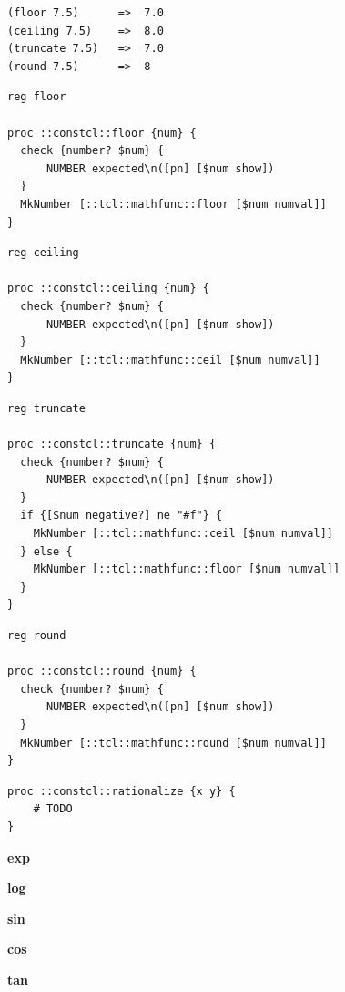 \documentclass[twoside,9pt]{report}
\begin{document}
\noindent\makebox[\linewidth]{\rule{\linewidth}{0.4pt}}
\begin{lstlisting}
(floor 7.5)      =>  7.0
(ceiling 7.5)    =>  8.0
(truncate 7.5)   =>  7.0
(round 7.5)      =>  8
\end{lstlisting}
\noindent\makebox[\linewidth]{\rule{\linewidth}{0.4pt}}
\noindent\makebox[\linewidth]{\rule{\linewidth}{0.4pt}}
\begin{lstlisting}
reg floor
 
proc ::constcl::floor {num} {
  check {number? $num} {
      NUMBER expected\n([pn] [$num show])
  }
  MkNumber [::tcl::mathfunc::floor [$num numval]]
}
\end{lstlisting}
\noindent\makebox[\linewidth]{\rule{\linewidth}{0.4pt}}
\noindent\makebox[\linewidth]{\rule{\linewidth}{0.4pt}}
\begin{lstlisting}
reg ceiling
 
proc ::constcl::ceiling {num} {
  check {number? $num} {
      NUMBER expected\n([pn] [$num show])
  }
  MkNumber [::tcl::mathfunc::ceil [$num numval]]
}
\end{lstlisting}
\noindent\makebox[\linewidth]{\rule{\linewidth}{0.4pt}}
\noindent\makebox[\linewidth]{\rule{\linewidth}{0.4pt}}
\begin{lstlisting}
reg truncate
 
proc ::constcl::truncate {num} {
  check {number? $num} {
      NUMBER expected\n([pn] [$num show])
  }
  if {[$num negative?] ne "#f"} {
    MkNumber [::tcl::mathfunc::ceil [$num numval]]
  } else {
    MkNumber [::tcl::mathfunc::floor [$num numval]]
  }
}
\end{lstlisting}
\noindent\makebox[\linewidth]{\rule{\linewidth}{0.4pt}}
\noindent\makebox[\linewidth]{\rule{\linewidth}{0.4pt}}
\begin{lstlisting}
reg round
 
proc ::constcl::round {num} {
  check {number? $num} {
      NUMBER expected\n([pn] [$num show])
  }
  MkNumber [::tcl::mathfunc::round [$num numval]]
}
\end{lstlisting}
\noindent\makebox[\linewidth]{\rule{\linewidth}{0.4pt}}
\noindent\makebox[\linewidth]{\rule{\linewidth}{0.4pt}}
\begin{lstlisting}
proc ::constcl::rationalize {x y} {
    # TODO
}
\end{lstlisting}
\noindent\makebox[\linewidth]{\rule{\linewidth}{0.4pt}}

\textbf{exp}


\textbf{log}


\textbf{sin}


\textbf{cos}


\textbf{tan}
\end{document}
